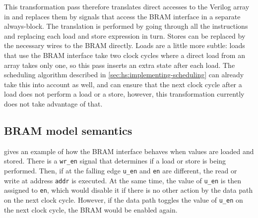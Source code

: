 
This transformation pass therefore translates direct accesses to the Verilog
array in \htl{} and replaces them by signals that access the \gls{BRAM}
interface in a separate always-block. The translation is performed by going
through all the instructions and replacing each load and store expression in
turn.  Stores can be replaced by the necessary wires to the \gls{BRAM}
directly. Loads are a little more subtle: loads that use the \gls{BRAM}
interface take two clock cycles where a direct load from an array takes only
one, so this pass inserts an extra state after each load.  The scheduling
algorithm described in \cref{sec:hs:implementing-scheduling} can already take
this into account as well, and can ensure that the next clock cycle after a load
does not perform a load or a store, however, this transformation currently does
not take advantage of that.

\subsection{BRAM model semantics}%
\label{sec:hg:bram-model-semantics}

 gives an example of how the \gls{BRAM} interface
behaves when values are loaded and stored.  There is a \texttt{wr\_en} signal
that determines if a load or store is being performed.  Then, if at the falling
edge \texttt{u\_en} and \texttt{en} are different, the read or write at address
\texttt{addr} is executed.  At the same time, the value of \texttt{u\_en} is
then assigned to \texttt{en}, which would disable it if there is no other action
by the data path on the next clock cycle.  However, if the data path toggles the
value of \texttt{u\_en} on the next clock cycle, the \gls{BRAM} would be enabled
again.

